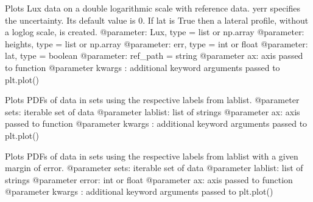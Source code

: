 \documentclass[letterpaper,10pt,english]{sphinxmanual}
\begin{document}

\begin{fulllineitems}
\label{\detokenize{index:windtunnel.plot_lux}}
Plots Lux data on a double logarithmic scale with reference data. yerr
specifies the uncertainty. Its default value is 0. If lat
is True then a lateral profile, without a loglog scale, is created.
@parameter: Lux, type = list or np.array
@parameter: heights, type = list or np.array
@parameter: err, type = int or float
@parameter: lat, type = boolean
@parameter: ref\_path = string
@parameter ax: axis passed to function
@parameter kwargs : additional keyword arguments passed to plt.plot()

\end{fulllineitems}


\begin{fulllineitems}
\label{\detokenize{index:windtunnel.plot_pdfs}}
Plots PDFs of data in sets using the respective labels from lablist.
@parameter sets: iterable set of data
@parameter lablist: list of strings
@parameter ax: axis passed to function
@parameter kwargs : additional keyword arguments passed to plt.plot()

\end{fulllineitems}


\begin{fulllineitems}
\label{\detokenize{index:windtunnel.plot_pdfs_err}}
Plots PDFs of data in sets using the respective labels from lablist with
a given margin of error.
@parameter sets: iterable set of data
@parameter lablist: list of strings
@parameter error: int or float
@parameter ax: axis passed to function
@parameter kwargs : additional keyword arguments passed to plt.plot()

\end{fulllineitems}
\end{document}
